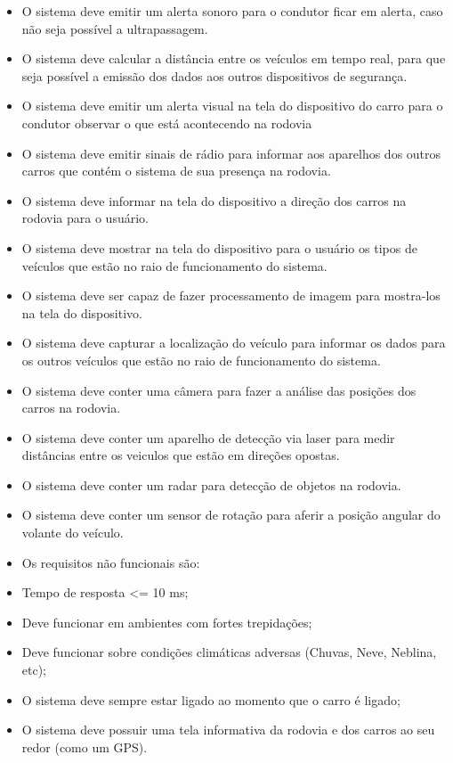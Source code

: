 \begin{itemize}
  \item O sistema deve emitir um alerta sonoro para o condutor ficar em alerta, caso não seja possível a ultrapassagem.
  \item O sistema deve calcular a distância entre os veículos em tempo real, para que seja possível a emissão dos dados aos outros dispositivos de segurança.
  \item O sistema deve emitir um alerta visual na tela do dispositivo do carro para o condutor observar o que está acontecendo na rodovia
  \item O sistema deve emitir sinais de rádio para informar aos aparelhos dos outros carros que contém o sistema de sua presença na rodovia.
  \item O sistema deve informar na tela do dispositivo a direção dos carros na rodovia para o usuário.
  \item O sistema deve mostrar na tela do dispositivo para o usuário os tipos de veículos que estão no raio de funcionamento do sistema.
  \item O sistema deve ser capaz de fazer processamento de imagem para mostra-los na tela do dispositivo.
  \item O sistema deve capturar a localização do veículo para informar os dados para os outros veículos que estão no raio de funcionamento do sistema.
  \item O sistema deve conter uma câmera para fazer a análise das posições dos carros na rodovia.
  \item O sistema deve conter um aparelho de detecção via laser para medir distâncias entre os veiculos que estão em direções opostas.
  \item O sistema deve conter um radar para detecção de objetos na rodovia.
  \item O sistema deve conter um sensor de rotação para aferir a posição angular do volante do veículo.

  \item Os requisitos não funcionais são:

\item   Tempo de resposta <= 10 ms;
  \item Deve funcionar em ambientes com fortes trepidações;
  \item Deve funcionar sobre condições climáticas adversas (Chuvas, Neve, Neblina, etc);
  \item O sistema deve sempre estar ligado ao momento que o carro é ligado;
  \item O sistema deve possuir uma tela informativa da rodovia e dos carros ao seu redor (como um GPS).
\end{itemize}
